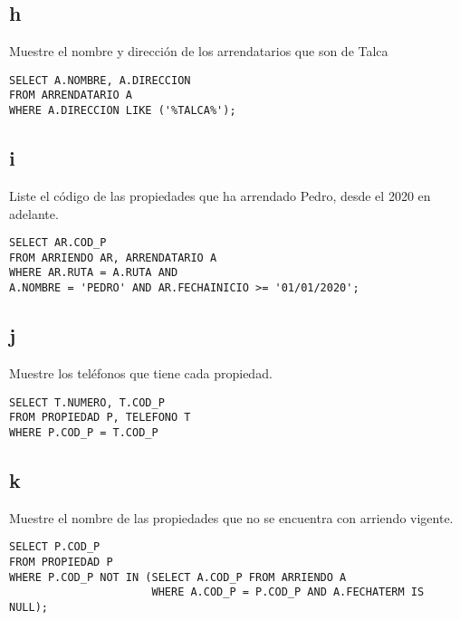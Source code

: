 \documentclass{templateNote}
\begin{document}
\subsection{h}
\indent
Muestre el nombre y dirección de los arrendatarios que son de Talca
\begin{tcolorbox}
    [colback=gray!5!white,colframe=gray!75!black,fonttitle=\bfseries,title=SQL]
    \begin{sqlcode}
    \end{sqlcode}
    \begin{verbatim}
SELECT A.NOMBRE, A.DIRECCION
FROM ARRENDATARIO A
WHERE A.DIRECCION LIKE ('%TALCA%');
    \end{verbatim}
\end{tcolorbox}

\newpage
\subsection{i}
\indent
Liste el código de las propiedades que ha arrendado Pedro, desde el 2020 en adelante.
\begin{tcolorbox}
    [colback=gray!5!white,colframe=gray!75!black,fonttitle=\bfseries,title=SQL]
    \begin{sqlcode}
    \end{sqlcode}
    \begin{verbatim}
SELECT AR.COD_P
FROM ARRIENDO AR, ARRENDATARIO A
WHERE AR.RUTA = A.RUTA AND
A.NOMBRE = 'PEDRO' AND AR.FECHAINICIO >= '01/01/2020';
    \end{verbatim}
\end{tcolorbox}

\subsection{j}
\indent
Muestre los teléfonos que tiene cada propiedad.
\begin{tcolorbox}
    [colback=gray!5!white,colframe=gray!75!black,fonttitle=\bfseries,title=SQL]
    \begin{sqlcode}
    \end{sqlcode}
    \begin{verbatim}
SELECT T.NUMERO, T.COD_P
FROM PROPIEDAD P, TELEFONO T
WHERE P.COD_P = T.COD_P
    \end{verbatim}
\end{tcolorbox}

\subsection{k}
\indent
Muestre el nombre de las propiedades que no se encuentra con arriendo vigente.
\begin{tcolorbox}
    [colback=gray!5!white,colframe=gray!75!black,fonttitle=\bfseries,title=SQL]
    \begin{sqlcode}
    \end{sqlcode}
    \begin{verbatim}
SELECT P.COD_P
FROM PROPIEDAD P
WHERE P.COD_P NOT IN (SELECT A.COD_P FROM ARRIENDO A
					  WHERE A.COD_P = P.COD_P AND A.FECHATERM IS NULL);
    \end{verbatim}
\end{tcolorbox}
\end{document}
